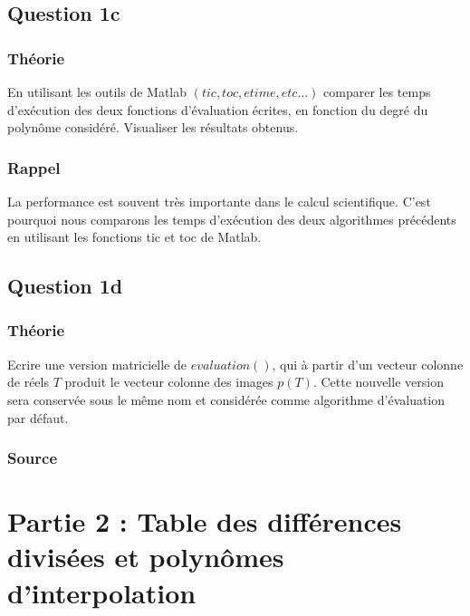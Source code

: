 \documentclass[a4paper,10pt]{report}
\begin{document}
\section*{Question 1c}

\subsection*{Théorie}

En utilisant les outils de Matlab $(tic, toc, etime, etc...)$ comparer les temps
d’exécution des deux fonctions d’évaluation écrites, en fonction du degré
du polynôme considéré. Visualiser les résultats obtenus.

\subsection*{Rappel}

La performance est souvent très importante dans le calcul scientifique. C’est pourquoi nous comparons les temps d’exécution des deux algorithmes précédents en utilisant les fonctions tic et toc de Matlab.

\section*{Question 1d}

\subsection*{Théorie}

Ecrire une version matricielle de $evaluation()$, qui à partir d’un vecteur
colonne de réels $T$ produit le vecteur colonne des images $p(T)$. Cette nouvelle
version sera conservée sous le même nom et considérée comme algorithme
d’évaluation par défaut.

\subsection*{Source}



\chapter*{Partie 2 : Table des différences divisées et polynômes d’interpolation}
\end{document}
